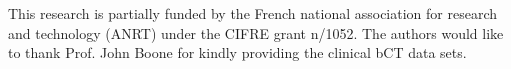 \documentclass[journal]{IEEEtran}
\begin{document}
This research is partially funded by the French national association
for research and technology (ANRT) under the CIFRE grant n/1052. The authors would like to thank Prof. John Boone for
kindly providing the clinical bCT data sets.


\ifCLASSOPTIONcaptionsoff
\newpage
\fi





% 
%




 

%
\end{document}

